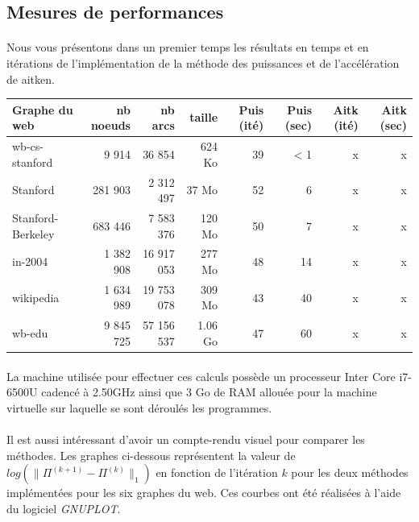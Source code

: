 	\subsection{Mesures de performances}
	
		\paragraph{}Nous vous présentons dans un premier temps les résultats en temps et en itérations de l'implémentation de la méthode des puissances et de l'accélération de aitken.
		
			\begin{center}\begin{tabular}{lrrrrrrr}
				\hline
				Graphe du web & nb noeuds & nb arcs & taille & Puis (ité) & Puis (sec) & Aitk (ité) & Aitk (sec) \\
				\hline
				wb-cs-stanford & 9 914 & 36 854 & 624 Ko & 39 & < 1 & x & x \\
				Stanford & 281 903 & 2 312 497 & 37 Mo & 52 & 6 & x & x \\
				Stanford-Berkeley & 683 446 & 7 583 376 & 120 Mo & 50 & 7 & x & x \\
				in-2004 & 1 382 908 & 16 917 053 & 277 Mo & 48 & 14 & x & x \\
				wikipedia & 1 634 989 & 19 753 078 & 309 Mo & 43 & 40 & x & x \\
				wb-edu & 9 845 725 & 57 156 537 & 1.06 Go & 47 & 60 & x & x \\
				\hline
			\end{tabular}\end{center}
			
		\paragraph{}La machine utilisée pour effectuer ces calculs possède un processeur Inter Core i7-6500U cadencé à 2.50GHz ainsi que 3 Go de RAM allouée pour la machine virtuelle sur laquelle se sont déroulés les programmes.
		
		\paragraph{}Il est aussi intéressant d'avoir un compte-rendu visuel pour comparer les méthodes. Les graphes ci-dessous représentent la valeur de $log(\| \Pi^{(k + 1)} - \Pi^{(k)} \|_{1})$ en fonction de l'itération $k$ pour les deux méthodes implémentées pour les six graphes du web. Ces courbes ont été réalisées à l'aide du logiciel \textit{GNUPLOT}.
